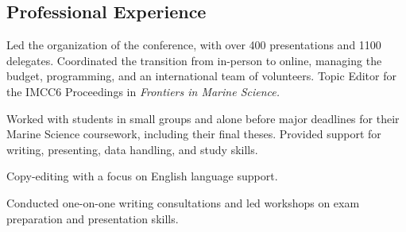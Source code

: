 \documentclass[a4paper]{deedy-resume} %
\begin{document}
\begin{flushleft}


\section{Professional Experience}


Led the organization of the conference, with over 400 presentations and 1100 delegates. Coordinated the transition from in-person to online, managing the budget, programming, and an international team of volunteers. Topic Editor for the IMCC6 Proceedings in \textit{Frontiers in Marine Science.}

\sectionspace



Worked with students in small groups and alone before major deadlines for their Marine Science coursework, including their final theses. Provided support for writing, presenting, data handling, and study skills.

\sectionspace



Copy-editing with a focus on English language support.

\sectionspace



Conducted one-on-one writing consultations and led workshops on exam preparation and presentation skills.

\sectionspace %




\end{flushleft}
\end{document}
